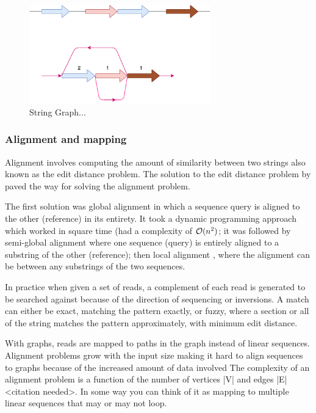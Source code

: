 \documentclass[a4paper]{article}
\begin{document}
\begin{enumerate}
\begin{figure}[H]
\centering
\includegraphics[width=0.7\textwidth]{figures/String Graph.png}
\caption{String Graph...}
\end{figure}\label{string graph}
\end{enumerate}

\subsubsection{Alignment and mapping}
\label{sec:orge859240}
Alignment involves computing the amount of similarity between two strings also 
known as the edit distance problem.
The solution to the edit distance problem by
\cite{levenshteinBinaryCodesCapable1966a} paved the way for solving the alignment
problem.

The first solution was global alignment
\cite{needlemanGeneralMethodApplicable1970} in which a sequence query is aligned
to the other (reference) in its entirety. It took a dynamic programming approach
which worked in square time (had a complexity of \(\mathcal{O}(n^2)\); it was followed
by semi-global alignment \cite{sellersTheoryComputationEvolutionary1980}
where one sequence (query) is entirely
aligned to a substring of the other (reference); then local alignment
\cite{smithIdentificationCommonMolecular1981}, where the alignment can be between 
any substrings of the two sequences.

In practice when given a set of reads, a complement of each read is generated to 
be searched against because of the direction of sequencing or inversions.
A match can either be exact, matching the pattern exactly, or fuzzy, where a 
section or all of the string matches the pattern approximately, with minimum 
edit distance.

With graphs, reads are mapped to paths in the graph instead of linear sequences.
Alignment problems grow with the input size
\cite{durbinEfficientHaplotypeMatching2014} making it hard to align sequences to
graphs  because of the increased amount of data involved
The complexity of an alignment problem is a function of the
number of  vertices |V| and edges |E| <citation needed>.  In some way you can
think of it as mapping to multiple linear sequences that may or may not loop.
\end{document}
